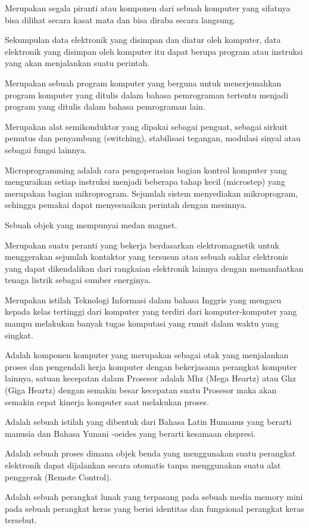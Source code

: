 
Merupakan segala piranti atau komponen dari sebuah komputer yang sifatnya bisa dilihat secara kasat mata dan bisa diraba secara langsung. 

Sekumpulan data elektronik yang disimpan dan diatur oleh komputer, data elektronik yang disimpan oleh komputer itu dapat berupa program atau instruksi yang akan menjalankan suatu perintah.

Merupakan sebuah program komputer yang berguna untuk menerjemahkan program komputer yang ditulis dalam bahasa pemrograman tertentu menjadi program yang ditulis dalam bahasa pemrograman lain.

Merupakan alat semikonduktor yang dipakai sebagai penguat, sebagai sirkuit pemutus dan penyambung (switching), stabilisasi tegangan, modulasi sinyal atau sebagai fungsi lainnya.

Microprogramming adalah cara pengoperasian bagian kontrol komputer yang menguraikan setiap instruksi menjadi beberapa tahap kecil (microstep) yang merupakan bagian mikroprogram. Sejumlah sistem menyediakan mikroprogram, sehingga pemakai dapat menyesuaikan perintah dengan mesinnya.

Sebuah objek yang mempunyai medan magnet.

Merupakan suatu peranti yang bekerja berdasarkan elektromagnetik untuk menggerakan sejumlah kontaktor yang tersusun atau sebuah saklar elektronis yang dapat dikendalikan dari rangkaian elektronik lainnya dengan memanfaatkan tenaga listrik sebagai sumber energinya.

Merupakan istilah Teknologi Informasi dalam bahasa Inggris yang mengacu kepada kelas tertinggi dari komputer yang terdiri dari komputer-komputer yang mampu melakukan banyak tugas komputasi yang rumit dalam waktu yang singkat.

Adalah komponen komputer yang merupakan sebagai otak yang menjalankan proses dan pengendali kerja komputer dengan bekerjasama perangkat komputer lainnya, satuan kecepatan dalam Prosesor adalah Mhz (Mega Heartz) atau Ghz (Giga Heartz) dengan semakin besar kecepatan suatu Prosesor maka akan semakin cepat kinerja komputer saat melakukan proses.

Adalah sebuah istilah yang dibentuk dari Bahasa Latin Humanus yang berarti manusia dan Bahasa Yunani -oeides yang berarti kesamaan ekspresi.

Adalah sebuah proses dimana objek benda yang menggunakan suatu
perangkat elektronik dapat dijalankan secara otomatis tanpa menggunakan suatu alat penggerak
(Remote Control).

 Adalah sebuah perangkat lunak yang terpasang pada sebuah media memory mini pada sebuah perangkat keras yang berisi identitas dan fungsional perangkat keras tersebut.